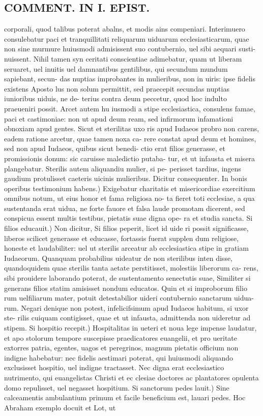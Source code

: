 \documentclass{article}
\begin{document}
\begin{pages}
\section*{COMMENT. IN I. EPIST. }
\marginpar{[ p.518 ]}\pstart corporali, quod talibus poterat abalns, et modis ains compeniari. Interimuero consulebatur paci et tranquillitati reliquarum uiduarum ecclesiasticarum, quae non sine murmure huiusmodi admisissent suo contubernio, uel sibi aequari susti- nuissent. Nihil tamen syn ceritati conscientiae adimebatur, quam ut liberam seruaret, uel inuitis uel damnantibus gentilibus, qui secundum mundum sapiebant, secun- das nuptias improbantes in mulieribus, non in uiris: ipse fidelis existens Aposto lus non solum permittit, sed praecepit secundas nuptias iunioribus uiduis, ne de- terius contra deum peccetur, quod hoc indulto praeueniri possit. Arcet autem hu iusmodi a stipe ecclesiastica, consulens famae, paci et castimoniae: non ut apud deum ream, sed infirmorum infamationi obnoxiam apud gentes. Sicut et sterilitas uxo ris apud Iudaeos probro non carens, eadem ratione arcetur, quae tamen noxa ca- rere constat apud deum et homines, sed non apud Iudaeos, quibus sicut benedi- ctio erat filios generasse, et promissionis donum: sic caruisse maledictio putaba- tur, et ut infausta et misera plangebatur. Sterilis autem aliquandiu mulier, si pe- perisset tardius, ingens gaudium protulisset caeteris uicinis mulieribus. Dicitur consequenter. In bonis operibus testimonium habens.) Exigebatur charitatis et misericordiae exercitium omnibus notum, ut eius honor et fama religiosa no- ta fieret toti ecclesiae, a qua sustentanda erat uidua, ne forte fauore et falsa laude promotam dicerent, sed conspicua essent multis testibus, pietatis suae digna ope- ra et studia sancta. Si filios educauit.) Non dicitur, Si filios peperit, licet id uide ri possit significasse, liberos scilicet generasse et educasse, fortassis fuerat supplen dum religiose, honeste et laudabiliter: uel ut sterilis arceatur ab ecclesiastica stipe in gratiam Iudaeorum. Quanquam probabilius uideatur de non sterilibus inten disse, quandoquidem quae sterilis tanta aetate perstitisset, molestiis liberorum ca- rens, sibi prouidere laborando poterat, de sustentamento senectutis suae, Similiter si generans filios statim amisisset nondum educatos. Quin et si improborum filio rum uelfiliarum mater, potuit detestabilior uideri contubernio sanctarum uidua- rum. Negari denique non potest, infelicifsimum apud Iudaeos habitum, si uxor ste- rilis cuiquam contigisset, quae et ut infausta, admittenda non uideretur ad stipem.  \pend\pstart Si hospitio recepit.) Hospitalitas in ueteri et noua lege impense laudatur, et apo stolorum tempore suscepisse praedicatores euangelii, et pro ueritate extorres patria, egentes, uagos et peregrinos, magnum pietatis officium non indigne habebatur: nec fidelis aestimari poterat, qui huiusmodi aliquando exclusisset hospitio, uel indigne tractasset. Nec digna erat ecclesiastico nutrimento, qui euangelistas Christi et ec clesiae doctores ac plantatores opulenta domo repulisset, uel negasset hospitium.  \pend\pstart Si sanctorum pedes lauit.) Sine calceamentis ambulantium primum et facile beneficium est, lauari pedes. Hoc Abraham exemplo docuit et Lot, ut 
\end{pages}
\end{document}
